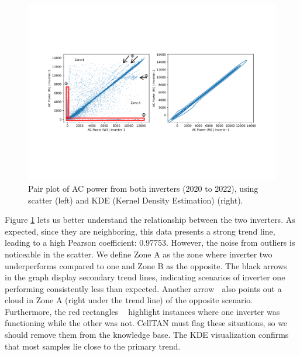 \begin{figure}[h!]
    \centering
    \includegraphics[width=\textwidth,trim={0 5.5cm 0cm 5.5cm},clip]{figures/chapter5/analysis/02_power_pairplots_kb_annotated-1.png}
    \caption{Pair plot of AC power from both inverters (2020 to 2022), using scatter (left) and KDE (Kernel Density Estimation) (right).}
    \label{fig:eda_power_kb_pair}
\end{figure}

Figure \ref{fig:eda_power_kb_pair} lets us better understand the relationship between the two inverters. As expected, since they are neighboring, this data presents a strong trend line, leading to a high Pearson coefficient: 0.97753. However, the noise from outliers is noticeable in the scatter. We define Zone A as the zone where inverter two underperforms compared to one and Zone B as the opposite. The black arrows \textcircled{} in the graph display secondary trend lines, indicating scenarios of inverter one performing consistently less than expected. Another arrow \textcircled{} also points out a cloud in Zone A (right under the trend line) of the opposite scenario. Furthermore, the red rectangles \textcircled{}\textcircled{} highlight instances where one inverter was functioning while the other was not. CellTAN must flag these situations, so we should remove them from the knowledge base. The KDE visualization confirms that most samples lie close to the primary trend.

